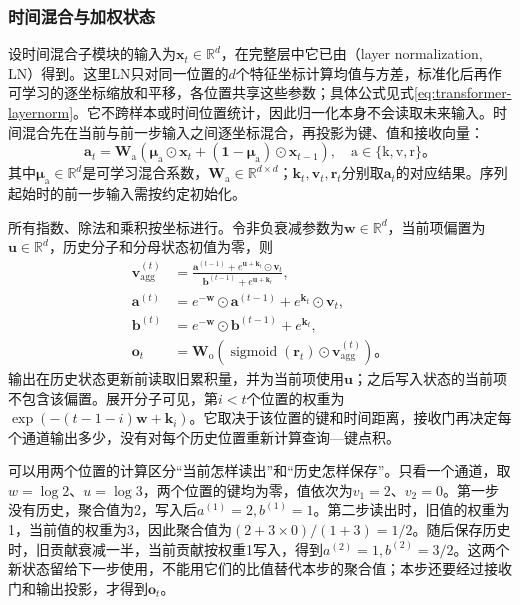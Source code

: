 \subsubsection{时间混合与加权状态}
\label{sec:rnn-rwkv-time-mixing}

设时间混合子模块的输入为$\bm{x}_t\in\mathbb{R}^{d}$，在完整层中它已由（layer normalization, LN）得到。这里LN只对同一位置的$d$个特征坐标计算均值与方差，标准化后再作可学习的逐坐标缩放和平移，各位置共享这些参数；具体公式见式\eqref{eq:transformer-layernorm}。它不跨样本或时间位置统计，因此归一化本身不会读取未来输入。时间混合先在当前与前一步输入之间逐坐标混合，再投影为键、值和接收向量：
\begin{equation}
  \bm{a}_t=\bm{W}_{\mathrm{a}}\!\left(
    \bm{\mu}_{\mathrm{a}}\odot\bm{x}_t
    +(\bm{1}-\bm{\mu}_{\mathrm{a}})\odot\bm{x}_{t-1}\right),
  \quad \mathrm{a}\in\{\mathrm{k},\mathrm{v},\mathrm{r}\}\text{。}
  \label{eq:rnn-rwkv-time-mixing}
\end{equation}
其中$\bm{\mu}_{\mathrm{a}}\in\mathbb{R}^{d}$是可学习混合系数，$\bm{W}_{\mathrm{a}}\in\mathbb{R}^{d\times d}$；$\bm{k}_t,\bm{v}_t,\bm{r}_t$分别取$\bm{a}_t$的对应结果。序列起始时的前一步输入需按约定初始化。

所有指数、除法和乘积按坐标进行。令非负衰减参数为$\bm{w}\in\mathbb{R}^{d}$，当前项偏置为$\bm{u}\in\mathbb{R}^{d}$，历史分子和分母状态初值为零，则
\begin{equation}
  \begin{aligned}
    \bm{v}_{\mathrm{agg}}^{(t)}&=
      \frac{\bm{a}^{(t-1)}+e^{\bm{u}+\bm{k}_t}\odot\bm{v}_t}
           {\bm{b}^{(t-1)}+e^{\bm{u}+\bm{k}_t}},\\
    \bm{a}^{(t)}&=e^{-\bm{w}}\odot\bm{a}^{(t-1)}
                    +e^{\bm{k}_t}\odot\bm{v}_t,\\
    \bm{b}^{(t)}&=e^{-\bm{w}}\odot\bm{b}^{(t-1)}+e^{\bm{k}_t},\\
    \bm{o}_t&=\bm{W}_{\mathrm{o}}\!\left(
      \operatorname{sigmoid}(\bm{r}_t)\odot\bm{v}_{\mathrm{agg}}^{(t)}\right)\text{。}
  \end{aligned}
  \label{eq:rnn-rwkv-recurrence}
\end{equation}
输出在历史状态更新前读取旧累积量，并为当前项使用$\bm{u}$；之后写入状态的当前项不包含该偏置。展开分子可见，第$i<t$个位置的权重为$\exp(-(t-1-i)\bm{w}+\bm{k}_i)$。它取决于该位置的键和时间距离，接收门再决定每个通道输出多少，没有对每个历史位置重新计算查询—键点积。

可以用两个位置的计算区分“当前怎样读出”和“历史怎样保存”。只看一个通道，取$w=\log2$、$u=\log3$，两个位置的键均为零，值依次为$v_1=2$、$v_2=0$。第一步没有历史，聚合值为2，写入后$a^{(1)}=2,b^{(1)}=1$。第二步读出时，旧值的权重为1，当前值的权重为3，因此聚合值为$(2+3\times0)/(1+3)=1/2$。随后保存历史时，旧贡献衰减一半，当前贡献按权重1写入，得到$a^{(2)}=1,b^{(2)}=3/2$。这两个新状态留给下一步使用，不能用它们的比值替代本步的聚合值；本步还要经过接收门和输出投影，才得到$\bm o_t$。

